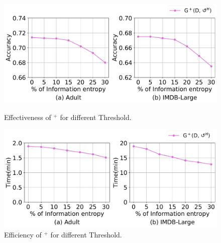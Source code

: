 \begin{figure}[t]   
	\centering
	\begin{minipage}[t]{0.49\textwidth}
		\centering
		\includegraphics[width=\columnwidth]{figs/entropy_acc}
	    \vspace{-1.5em}
		\caption{Effectiveness of \ours$^+$ for different Threshold.}
		\label{fig:entropy_acc}
	\end{minipage}
	\begin{minipage}[t]{0.49\textwidth}
		\centering
		\includegraphics[width=\columnwidth]{figs/entropy_time}
	    \vspace{-1.5em}
		\caption{Efficiency of \ours$^+$ for different Threshold.}
		\label{fig:entropy_time}
	\end{minipage}
	\vspace*{-1em}   
\end{figure}